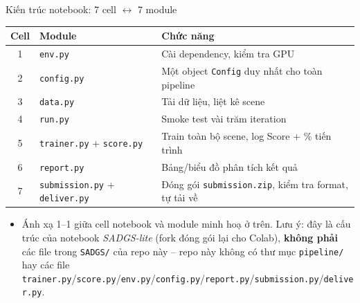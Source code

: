 \begin{frame}{Kiến trúc notebook: 7 cell $\leftrightarrow$ 7 module}
\footnotesize
\begin{table}
\centering
\begin{tabular}{cll}
\toprule
\textbf{Cell} & \textbf{Module} & \textbf{Chức năng} \\
\midrule
1 & \texttt{env.py} & Cài dependency, kiểm tra GPU \\
2 & \texttt{config.py} & Một object \texttt{Config} duy nhất cho toàn pipeline \\
3 & \texttt{data.py} & Tải dữ liệu, liệt kê scene \\
4 & \texttt{run.py} & Smoke test vài trăm iteration \\
5 & \texttt{trainer.py} + \texttt{score.py} & Train toàn bộ scene, log Score + \% tiến trình \\
6 & \texttt{report.py} & Bảng/biểu đồ phân tích kết quả \\
7 & \texttt{submission.py} + \texttt{deliver.py} & Đóng gói \texttt{submission.zip}, kiểm tra format, tự tải về \\
\bottomrule
\end{tabular}
\end{table}
\normalsize
\begin{itemize}
    \item Ánh xạ 1--1 giữa cell notebook và module minh hoạ ở trên. \alert{Lưu ý}: đây là cấu trúc của notebook \emph{SADGS-lite} (fork đóng gói lại cho Colab), \textbf{không phải} các file trong \texttt{SADGS/} của repo này -- repo này không có thư mục \texttt{pipeline/} hay các file \texttt{trainer.py}/\texttt{score.py}/\texttt{env.py}/\texttt{config.py}/\texttt{report.py}/\texttt{submission.py}/\texttt{deliver.py}.
\end{itemize}
\end{frame}

